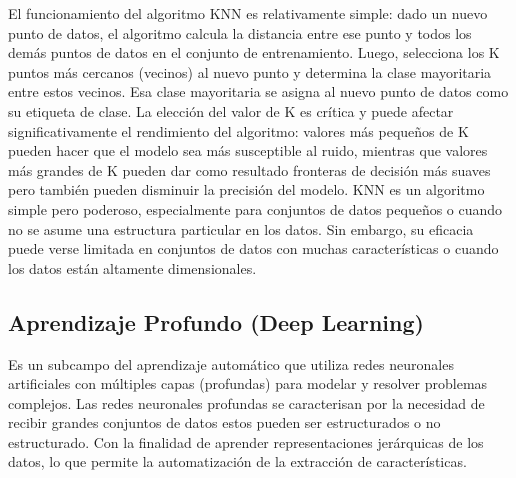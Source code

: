 El funcionamiento del algoritmo KNN es relativamente simple: dado un nuevo punto de datos, el algoritmo calcula la distancia entre ese punto y todos los demás puntos de datos en el conjunto de entrenamiento. Luego, selecciona los K puntos más cercanos (vecinos) al nuevo punto y determina la clase mayoritaria entre estos vecinos. Esa clase mayoritaria se asigna al nuevo punto de datos como su etiqueta de clase. La elección del valor de K es crítica y puede afectar significativamente el rendimiento del algoritmo: valores más pequeños de K pueden hacer que el modelo sea más susceptible al ruido, mientras que valores más grandes de K pueden dar como resultado fronteras de decisión más suaves pero también pueden disminuir la precisión del modelo. KNN es un algoritmo simple pero poderoso, especialmente para conjuntos de datos pequeños o cuando no se asume una estructura particular en los datos. Sin embargo, su eficacia puede verse limitada en conjuntos de datos con muchas características o cuando los datos están altamente dimensionales.






\subsection{Aprendizaje Profundo (Deep Learning)}
Es un subcampo del aprendizaje automático que utiliza redes neuronales artificiales con múltiples capas (profundas) para modelar y resolver problemas complejos. Las redes neuronales profundas se caracterisan por la necesidad de recibir grandes conjuntos de datos estos pueden ser estructurados o no estructurado. Con la finalidad de aprender representaciones jerárquicas de los datos, lo que permite la automatización de la extracción de características.

